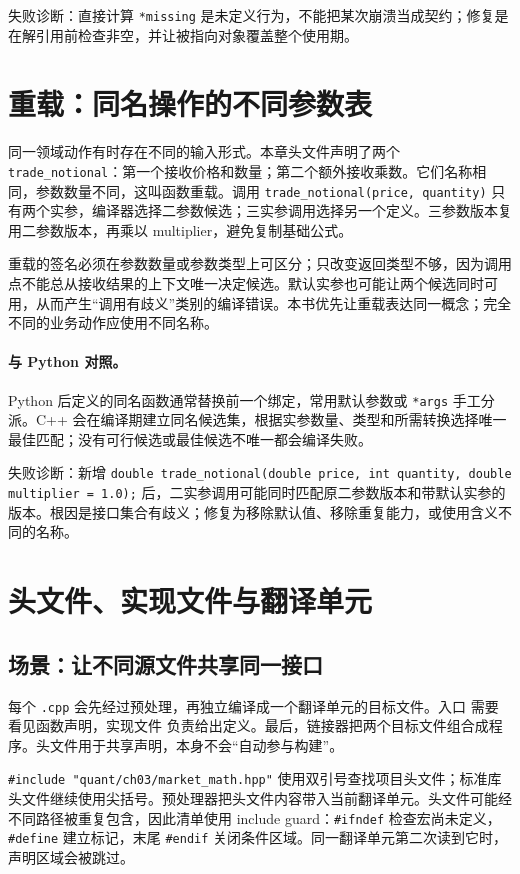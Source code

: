 失败诊断：直接计算 \texttt{*missing} 是未定义行为，不能把某次崩溃当成契约；修复是在解引用前检查非空，并让被指向对象覆盖整个使用期。

\section{重载：同名操作的不同参数表}

同一领域动作有时存在不同的输入形式。本章头文件声明了两个 \texttt{trade\_notional}：第一个接收价格和数量；第二个额外接收乘数。它们名称相同，参数数量不同，这叫函数重载。调用 \texttt{trade\_notional(price, quantity)} 只有两个实参，编译器选择二参数候选；三实参调用选择另一个定义。三参数版本复用二参数版本，再乘以 multiplier，避免复制基础公式。

重载的签名必须在参数数量或参数类型上可区分；只改变返回类型不够，因为调用点不能总从接收结果的上下文唯一决定候选。默认实参也可能让两个候选同时可用，从而产生“调用有歧义”类别的编译错误。本书优先让重载表达同一概念；完全不同的业务动作应使用不同名称。

\paragraph{与 Python 对照。}
Python 后定义的同名函数通常替换前一个绑定，常用默认参数或 \texttt{*args} 手工分派。C++ 会在编译期建立同名候选集，根据实参数量、类型和所需转换选择唯一最佳匹配；没有可行候选或最佳候选不唯一都会编译失败。

失败诊断：新增 \texttt{double trade\_notional(double price, int quantity, double multiplier = 1.0);} 后，二实参调用可能同时匹配原二参数版本和带默认实参的版本。根因是接口集合有歧义；修复为移除默认值、移除重复能力，或使用含义不同的名称。

\section{头文件、实现文件与翻译单元}

\subsection{场景：让不同源文件共享同一接口}

每个 \texttt{.cpp} 会先经过预处理，再独立编译成一个翻译单元的目标文件。入口  需要看见函数声明，实现文件  负责给出定义。最后，链接器把两个目标文件组合成程序。头文件用于共享声明，本身不会“自动参与构建”。

\texttt{\#include "quant/ch03/market\_math.hpp"} 使用双引号查找项目头文件；标准库头文件继续使用尖括号。预处理器把头文件内容带入当前翻译单元。头文件可能经不同路径被重复包含，因此清单使用 include guard：\texttt{\#ifndef} 检查宏尚未定义，\texttt{\#define} 建立标记，末尾 \texttt{\#endif} 关闭条件区域。同一翻译单元第二次读到它时，声明区域会被跳过。

